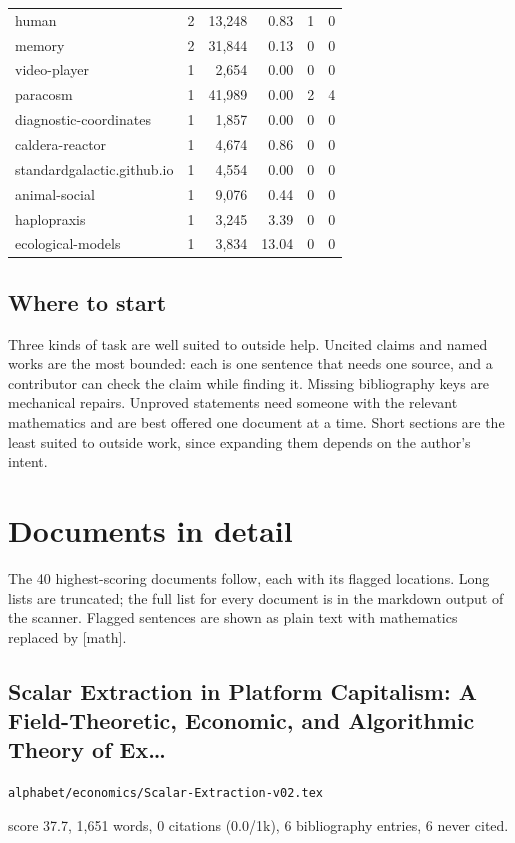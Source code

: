 \documentclass[11pt]{article}
\newcommand{\loc}[1]{{\small\color{muted}\texttt{#1}}}
\begin{document}
\begin{center}
\begin{tabular}{lrrrrr}
human & 2 & 13,248 & 0.83 & 1 & 0 \\
memory & 2 & 31,844 & 0.13 & 0 & 0 \\
video-player & 1 & 2,654 & 0.00 & 0 & 0 \\
paracosm & 1 & 41,989 & 0.00 & 2 & 4 \\
diagnostic-coordinates & 1 & 1,857 & 0.00 & 0 & 0 \\
caldera-reactor & 1 & 4,674 & 0.86 & 0 & 0 \\
standardgalactic.github.io & 1 & 4,554 & 0.00 & 0 & 0 \\
animal-social & 1 & 9,076 & 0.44 & 0 & 0 \\
haplopraxis & 1 & 3,245 & 3.39 & 0 & 0 \\
ecological-models & 1 & 3,834 & 13.04 & 0 & 0 \\
\bottomrule\end{tabular}\end{center}
\subsection*{Where to start}
Three kinds of task are well suited to outside help. Uncited claims and named works are the most bounded: each is one sentence that needs one source, and a contributor can check the claim while finding it. Missing bibliography keys are mechanical repairs. Unproved statements need someone with the relevant mathematics and are best offered one document at a time. Short sections are the least suited to outside work, since expanding them depends on the author's intent.

\section{Documents in detail}

The 40 highest-scoring documents follow, each with its flagged locations. Long lists are truncated; the full list for every document is in the markdown output of the scanner. Flagged sentences are shown as plain text with mathematics replaced by [math].

\subsection{Scalar Extraction in Platform Capitalism: A Field-Theoretic, Economic, and Algorithmic Theory of Ex\ldots{}}
\loc{alphabet/\allowbreak{}economics/\allowbreak{}Scalar-Extraction-v02.tex}\par
score 37.7, 1,651 words, 0 citations (0.0/1k), 6 bibliography entries, 6 never cited.
\end{document}
